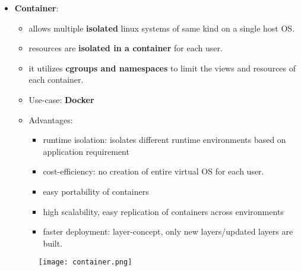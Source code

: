\begin{itemize}
\begin{itemize}
	\end{itemize}
	\item \textbf{Container}: 
	\begin{itemize}
		\item allows multiple \textbf{isolated} linux systems of same kind on a single host OS.
		\item resources are \textbf{isolated in a container} for each user.
		\item it utilizes \textbf{cgroups and namespaces} to limit the views and resources of each container.
		\item Use-case: \textbf{Docker}
		\item Advantages:
		\begin{itemize}
			\item runtime isolation: isolates different runtime environments based on application requirement
			\item cost-efficiency: no creation of entire virtual OS for each user.
			\item easy portability of containers
			\item high scalability, easy replication of containers across environments
			\item faster deployment: layer-concept, only new layers/updated layers are built. 
			 
		\end{itemize}
	\end{itemize}
	\begin{figure}[H]
		\centering
		\texttt{[image: container.png]}
	\end{figure}
\end{itemize}


